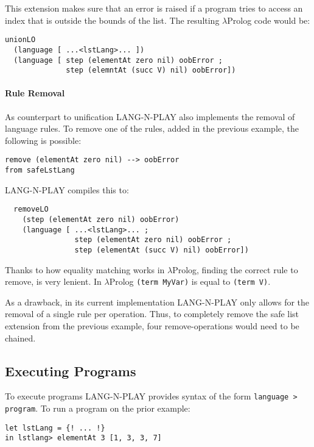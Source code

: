 This extension makes sure that an error is raised if a program tries to access an index that is outside the bounds of the list. The resulting $\lambda$Prolog code would be:

\begin{verbatim}
unionLO
  (language [ ...<lstLang>... ])
  (language [ step (elementAt zero nil) oobError ;
              step (elemntAt (succ V) nil) oobError])
\end{verbatim}

\paragraph{Rule Removal}
As counterpart to unification LANG-N-PLAY also implements the removal of language rules. To remove one of the rules, added in the previous example, the following is possible:

\begin{verbatim}
remove (elementAt zero nil) --> oobError
from safeLstLang 
\end{verbatim}

LANG-N-PLAY compiles this to:

\begin{verbatim}
  removeLO
    (step (elementAt zero nil) oobError)
    (language [ ...<lstLang>... ;
                step (elementAt zero nil) oobError ;
                step (elementAt (succ V) nil) oobError])
\end{verbatim}

Thanks to how equality matching works in $\lambda$Prolog, finding the correct rule to remove, is very lenient. In $\lambda$Prolog \lstinline|(term MyVar)| is equal to \lstinline|(term V)|.

As a drawback, in its current implementation LANG-N-PLAY only allows for the removal of a single rule per operation. Thus, to completely remove the safe list extension from the previous example, four remove-operations would need to be chained.


\subsection{Executing Programs}
To execute programs LANG-N-PLAY provides syntax of the form \lstinline|language > program|. To run a program on the prior example:

\begin{verbatim}
let lstLang = {! ... !}
in lstlang> elementAt 3 [1, 3, 3, 7]
\end{verbatim}

